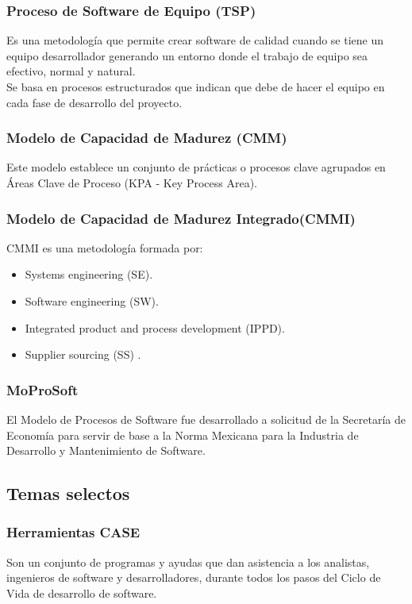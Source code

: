 \documentclass[12pt,twoside]{article}
\begin{document}
\subsubsection{Proceso de Software de Equipo (TSP)}
Es una metodología que permite crear software de calidad cuando se tiene un equipo 
desarrollador generando un entorno donde el trabajo de equipo sea efectivo, normal y 
natural.\\
Se basa en procesos estructurados que indican que debe de hacer el equipo en cada 
fase de desarrollo del proyecto.\\
\subsubsection{Modelo de Capacidad de Madurez (CMM)}
Este modelo establece un conjunto de prácticas o procesos clave agrupados en Áreas 
Clave de Proceso (KPA - Key Process Area).\\
\subsubsection{Modelo de Capacidad de Madurez Integrado(CMMI)}
CMMI es una metodología formada por:
\begin{itemize}
    \item Systems engineering (SE).
    \item Software engineering (SW).
    \item Integrated product and process development (IPPD).
    \item Supplier sourcing (SS) .
\end{itemize}
\subsubsection{MoProSoft}
El Modelo de Procesos de Software fue desarrollado a solicitud de la Secretaría de 
Economía para servir de base a la Norma Mexicana para la Industria de Desarrollo y 
Mantenimiento de Software.

\subsection{Temas selectos}
\subsubsection{Herramientas CASE}
Son un conjunto de programas y ayudas que dan asistencia a los analistas, ingenieros 
de software y desarrolladores, durante todos los pasos del Ciclo de Vida de desarrollo 
de software.\\
\end{document}
